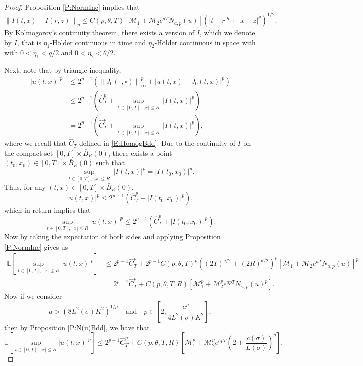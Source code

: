 \documentclass[12pt]{report}
\theoremstyle{plain}
\theoremstyle{definition}
\numberwithin{equation}{section}
\newcommand{\Norm}[1]{\left\|  #1   \right\|}
\begin{document}
\begin{proof}
	Proposition \ref{P:NormInc} implies that 
	\begin{equation}
	\Norm{I(t,x) - I(r,z)}_p \le C(p,\theta, T)\left[ \mathcal{M}_1 + \mathcal{M}_2e^{aT}N_{a,p}(u) \right]\left(|t-r|^{q} + |x-z|^{\theta}\right)^{1/2}.
	\end{equation}
	By Kolmogorov's continuity theorem, there exists a version of $I$, which we denote by $I$, that is $\eta_1$-H\"older continuous in time and $\eta_2$-H\"older continuous in space with with $0<\eta_1 < q/2$ and $0<\eta_2 < \theta/2$.
	
	Next, note that by triangle inequality,
	\begin{align*}
	|u(t,x)|^p &\le 2^{p-1}\left( \Norm{J_0(\cdot,\circ)}_{\infty}^p + |u(t,x)-J_0(t,x)|^p \right) \\
	&\le 2^{p-1}\left( \widehat{C}_T^p + \sup_{t\in[0,T],\; |x| \le R} \: |I(t,x)|^p \right) \\
	&= 2^{p-1}\left( \widehat{C}_T^p + \sup_{t\in[0,T],\; |x| \le R} \: |I(t,x)|^p\right),
	\end{align*}
	where we recall that $\widehat{C}_T$ defined in \eqref{E:HomogBdd}. Due to the continuity of $I$ on the compact set $[0,T] \times \bar{B}_R(0)$, there exists a point $(t_0,x_0) \in [0,T] \times \bar{B}_R(0)$ such that 
	\[
	\sup_{t\in[0,T],\; |x| \le R} \: |I(t,x)|^p = |I(t_0,x_0)|^p.
	\]
	Thus, for any $(t,x) \in [0,T] \times \bar{B}_R(0)$,
	\[
	|u(t,x)|^p \le 2^{p-1}\left( \widehat{C}_T^p  + |I(t_0,x_0)|^p \right),
	\] 
	which in return implies that 
	\[
	\sup_{t\in[0,T],\; |x| \le R} |u(t,x)|^p \le 2^{p-1}\left(\widehat{C}_T^p + |I(t_0,x_0)|^p \right).
	\]
	Now by taking the expectation of both sides and applying Proposition \ref{P:NormInc} gives us 
	\begin{align*}
	\mathbb{E}\left[ \sup_{t\in[0,T],\; |x| \le R} |u(t,x)|^p \right] &\le  2^{p-1}\widehat{C}_T^p  + 2^{p-1}C(p, \theta, T)^p\left((2T)^{q/2} + (2R)^{\theta /2}\right)^p\left[ \mathcal{M}_1 + \mathcal{M}_2 e^{aT} N_{a,p}(u)\right]^p \\
	&= 2^{p-1}\widehat{C}_T^p  + C(p, \theta, T,R) \left[ \mathcal{M}_1^p + \mathcal{M}_2^p e^{apT} N_{a,p}(u)^p\right].
	\end{align*}
	Now if we consider
	\[
	a > \left( 8 L^2(\sigma)K^2\right)^{1/\rho} \quad \text{and} \quad 	p \in \left[ 2, \frac{a^{\rho}}{4L^2(\sigma)K^2} \right],
	\]
	then by Proposition \ref{P:N(u)Bdd}, we have that 
	\[
	\mathbb{E}\left[ \sup_{t\in[0,T],\; |x| \le R} |u(t,x)|^p \right] \le 2^{p-1}\widehat{C}_T^p  + C(p, \theta, T,R) \left[ \mathcal{M}_1^p + \mathcal{M}_2^p e^{apT} \left(2 +  \frac{c(\sigma)}{L(\sigma)}\right)^p\right].
	\]
\end{proof}
\end{document}
